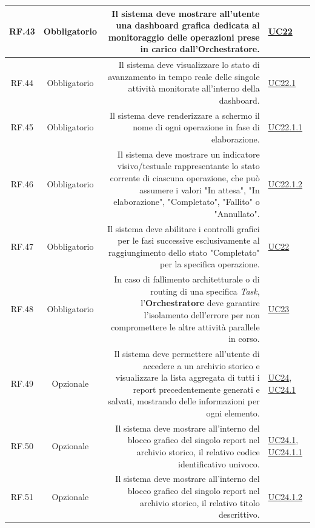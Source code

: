 \documentclass[12pt, a4paper]{article}
\begin{document}
\begin{xltabular}{\textwidth}{|c|c|D|F|}
    RF.43 & Obbligatorio & Il sistema deve mostrare all'utente una dashboard grafica dedicata al monitoraggio delle operazioni prese in carico dall'\textbf{Orchestratore}. & \hyperref[uc:22]{UC22} \\ \hline
    
    RF.44 & Obbligatorio & Il sistema deve visualizzare lo stato di avanzamento in tempo reale delle singole attività monitorate all'interno della dashboard. & \hyperref[uc:22.1]{UC22.1} \\ \hline
    
    RF.45 & Obbligatorio & Il sistema deve renderizzare a schermo il nome di ogni operazione in fase di elaborazione. & \hyperref[uc:22.1.1]{UC22.1.1} \\ \hline
    
    RF.46 & Obbligatorio & Il sistema deve mostrare un indicatore visivo/testuale rappresentante lo stato corrente di ciascuna operazione, che può assumere i valori "In attesa", "In elaborazione", "Completato", "Fallito" o "Annullato". & \hyperref[uc:22.1.2]{UC22.1.2} \\ \hline

    RF.47 & Obbligatorio & Il sistema deve abilitare i controlli grafici per le fasi successive esclusivamente al raggiungimento dello stato "Completato" per la specifica operazione. & \hyperref[uc:22]{UC22} \\ \hline
    
    RF.48 & Obbligatorio & In caso di fallimento architetturale o di routing di una specifica \textit{Task}, l'\textbf{Orchestratore} deve garantire l'isolamento dell'errore per non compromettere le altre attività parallele in corso. & \hyperref[uc:23]{UC23} \\ \hline
    
    RF.49 & Opzionale & Il sistema deve permettere all'utente di accedere a un archivio storico e visualizzare la lista aggregata di tutti i report precedentemente generati e salvati, mostrando delle informazioni per ogni elemento. & \hyperref[uc:24]{UC24}, \hyperref[uc:24.1]{UC24.1} \\ \hline
    
    RF.50 & Opzionale & Il sistema deve mostrare all'interno del blocco grafico del singolo report nel archivio storico, il relativo codice identificativo univoco. & \hyperref[uc:24.1]{UC24.1}, \hyperref[uc:24.1.1]{UC24.1.1} \\ \hline
    
    RF.51 & Opzionale & Il sistema deve mostrare all'interno del blocco grafico del singolo report nel archivio storico, il relativo titolo descrittivo. & \hyperref[uc:24.1.2]{UC24.1.2} \\ \hline
    

\end{xltabular}
\end{document}
